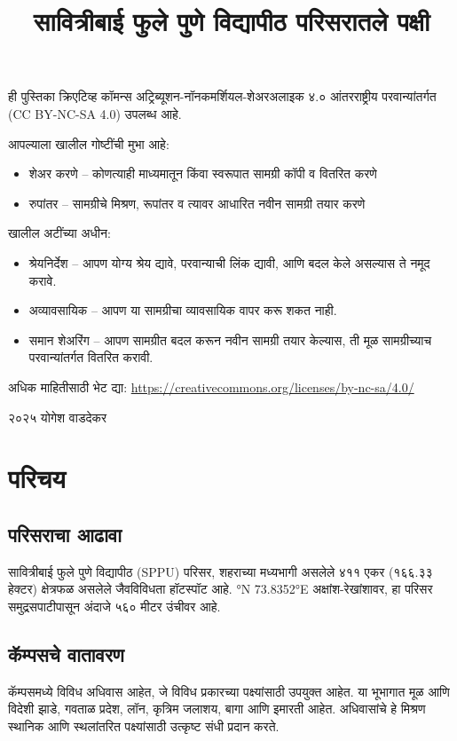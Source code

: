 \documentclass[a4paper,12pt,landscape]{memoir}
\title{सावित्रीबाई फुले पुणे विद्यापीठ परिसरातले पक्षी}
\author{}
\date{}
\newcommand{\introsection}[2]{%
  \begin{minipage}[t]{0.48\textwidth}
    \begin{mdframed}[
      linecolor=headingcolor,
      linewidth=1pt,
      roundcorner=5pt,
      leftmargin=0pt,
      rightmargin=0pt,
      backgroundcolor=headingcolor!5
    ]
      #1
    \end{mdframed}
  \end{minipage}\hfill
  \begin{minipage}[t]{0.48\textwidth}
    \begin{mdframed}[
      linecolor=headingcolor,
      linewidth=1pt,
      roundcorner=5pt,
      leftmargin=0pt,
      rightmargin=0pt,
      backgroundcolor=headingcolor!5
    ]
      #2
    \end{mdframed}
  \end{minipage}
  \newpage
}
\begin{document}
\maketitle

\begin{center}
\vspace{1cm}
{\large ही पुस्तिका क्रिएटिव्ह कॉमन्स अट्रिब्यूशन-नॉनकमर्शियल-शेअरअलाइक ४.० आंतरराष्ट्रीय परवान्यांतर्गत ({\latintext CC BY-NC-SA 4.0}) उपलब्ध आहे.}

\vspace{0.5cm}
{\normalsize आपल्याला खालील गोष्टींची मुभा आहे:
\begin{itemize}
\item शेअर करणे -- कोणत्याही माध्यमातून किंवा स्वरूपात सामग्री कॉपी व वितरित करणे
\item रुपांतर -- सामग्रीचे मिश्रण, रूपांतर व त्यावर आधारित नवीन सामग्री तयार करणे
\end{itemize}

खालील अटींच्या अधीन:
\begin{itemize}
\item श्रेयनिर्देश -- आपण योग्य श्रेय द्यावे, परवान्याची लिंक द्यावी, आणि बदल केले असल्यास ते नमूद करावे.
\item अव्यावसायिक -- आपण या सामग्रीचा व्यावसायिक वापर करू शकत नाही.
\item समान शेअरिंग -- आपण सामग्रीत बदल करून नवीन सामग्री तयार केल्यास, ती मूळ सामग्रीच्याच परवान्यांतर्गत वितरित करावी.
\end{itemize}
}

\vspace{0.5cm}
{\small अधिक माहितीसाठी भेट द्या: 
{\latinmono \href{https://creativecommons.org/licenses/by-nc-sa/4.0/}{https://creativecommons.org/licenses/by-nc-sa/4.0/}}}

\vspace{1cm}

{\large{\latintext \textcopyright} २०२५ योगेश वाडदेकर}
\end{center}


\chapter*{परिचय}

\introsection{%
  \section*{\textbf{परिसराचा आढावा}}
  सावित्रीबाई फुले पुणे विद्यापीठ ({\latintext SPPU}) परिसर, शहराच्या मध्यभागी असलेले ४११ एकर (१६६.३३ हेक्टर) क्षेत्रफळ असलेले 
  जैवविविधता हॉटस्पॉट आहे. {\latintext 18.5529°N 73.8352°E} अक्षांश-रेखांशावर, हा परिसर समुद्रसपाटीपासून अंदाजे ५६० मीटर उंचीवर आहे.
}{%
  \section*{कॅम्पसचे वातावरण}
  कॅम्पसमध्ये विविध अधिवास आहेत, जे विविध प्रकारच्या पक्ष्यांसाठी उपयुक्त आहेत. या भूभागात मूळ आणि विदेशी झाडे, गवताळ प्रदेश, लॉन, कृत्रिम जलाशय,
   बागा आणि इमारती आहेत. अधिवासांचे हे मिश्रण स्थानिक आणि स्थलांतरित पक्ष्यांसाठी उत्कृष्ट संधी प्रदान करते.
}
\end{document}

